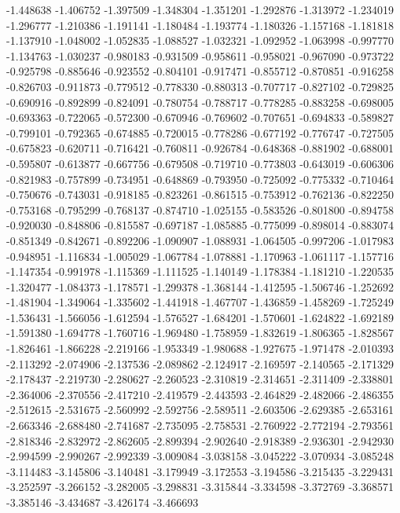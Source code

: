 -1.448638
-1.406752
-1.397509
-1.348304
-1.351201
-1.292876
-1.313972
-1.234019
-1.296777
-1.210386
-1.191141
-1.180484
-1.193774
-1.180326
-1.157168
-1.181818
-1.137910
-1.048002
-1.052835
-1.088527
-1.032321
-1.092952
-1.063998
-0.997770
-1.134763
-1.030237
-0.980183
-0.931509
-0.958611
-0.958021
-0.967090
-0.973722
-0.925798
-0.885646
-0.923552
-0.804101
-0.917471
-0.855712
-0.870851
-0.916258
-0.826703
-0.911873
-0.779512
-0.778330
-0.880313
-0.707717
-0.827102
-0.729825
-0.690916
-0.892899
-0.824091
-0.780754
-0.788717
-0.778285
-0.883258
-0.698005
-0.693363
-0.722065
-0.572300
-0.670946
-0.769602
-0.707651
-0.694833
-0.589827
-0.799101
-0.792365
-0.674885
-0.720015
-0.778286
-0.677192
-0.776747
-0.727505
-0.675823
-0.620711
-0.716421
-0.760811
-0.926784
-0.648368
-0.881902
-0.688001
-0.595807
-0.613877
-0.667756
-0.679508
-0.719710
-0.773803
-0.643019
-0.606306
-0.821983
-0.757899
-0.734951
-0.648869
-0.793950
-0.725092
-0.775332
-0.710464
-0.750676
-0.743031
-0.918185
-0.823261
-0.861515
-0.753912
-0.762136
-0.822250
-0.753168
-0.795299
-0.768137
-0.874710
-1.025155
-0.583526
-0.801800
-0.894758
-0.920030
-0.848806
-0.815587
-0.697187
-1.085885
-0.775099
-0.898014
-0.883074
-0.851349
-0.842671
-0.892206
-1.090907
-1.088931
-1.064505
-0.997206
-1.017983
-0.948951
-1.116834
-1.005029
-1.067784
-1.078881
-1.170963
-1.061117
-1.157716
-1.147354
-0.991978
-1.115369
-1.111525
-1.140149
-1.178384
-1.181210
-1.220535
-1.320477
-1.084373
-1.178571
-1.299378
-1.368144
-1.412595
-1.506746
-1.252692
-1.481904
-1.349064
-1.335602
-1.441918
-1.467707
-1.436859
-1.458269
-1.725249
-1.536431
-1.566056
-1.612594
-1.576527
-1.684201
-1.570601
-1.624822
-1.692189
-1.591380
-1.694778
-1.760716
-1.969480
-1.758959
-1.832619
-1.806365
-1.828567
-1.826461
-1.866228
-2.219166
-1.953349
-1.980688
-1.927675
-1.971478
-2.010393
-2.113292
-2.074906
-2.137536
-2.089862
-2.124917
-2.169597
-2.140565
-2.171329
-2.178437
-2.219730
-2.280627
-2.260523
-2.310819
-2.314651
-2.311409
-2.338801
-2.364006
-2.370556
-2.417210
-2.419579
-2.443593
-2.464829
-2.482066
-2.486355
-2.512615
-2.531675
-2.560992
-2.592756
-2.589511
-2.603506
-2.629385
-2.653161
-2.663346
-2.688480
-2.741687
-2.735095
-2.758531
-2.760922
-2.772194
-2.793561
-2.818346
-2.832972
-2.862605
-2.899394
-2.902640
-2.918389
-2.936301
-2.942930
-2.994599
-2.990267
-2.992339
-3.009084
-3.038158
-3.045222
-3.070934
-3.085248
-3.114483
-3.145806
-3.140481
-3.179949
-3.172553
-3.194586
-3.215435
-3.229431
-3.252597
-3.266152
-3.282005
-3.298831
-3.315844
-3.334598
-3.372769
-3.368571
-3.385146
-3.434687
-3.426174
-3.466693
